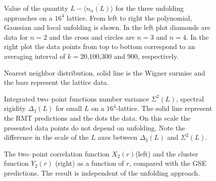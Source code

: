 \begin{figure}
\caption{Value of the quantity
  $L-\overline{\langle n_\alpha(L)\rangle}$ for the three unfolding
  approaches on a $16^4$ lattice. From left to right the polynomial,
  Gaussian and local unfolding is shown. In the left plot diamonds are
  data for $n=2$ and the cross and circles are $n=3$ and $n=4$.  In
  the right plot the data points from top to bottom correspond to an
  averaging interval of $k=20$,100,300 and 900,
  respectively.\label{mean}}
\end{figure}

\begin{figure}
\caption{Nearest neighbor distribution, solid line is the Wigner surmise
  and the bars represent the lattice data.\label{near}}
\end{figure}

\begin{figure}
\begin{minipage}{7.5cm}
  \centerline{}
\end{minipage}
\hfill
\begin{minipage}{7.5cm}
\centerline{}
\end{minipage}
\caption{Integrated two--point functions number variance $\Sigma^2(L)$,
  spectral rigidity $\Delta_3(L)$ for small $L$ on a $16^4$-lattice.
  The solid line represent the RMT predictions and the dots the data.
  On this scale the presented data points do not depend on unfolding.
  Note the difference in the scale of the $L$ axes between
  $\Delta_3(L)$ and $\Sigma^2(L)$.
  \label{agree1}}
\end{figure}

\begin{figure}
\begin{minipage}{7.5cm}
\centerline{}
\end{minipage}
\begin{minipage}{7.5cm}
\centerline{}
\end{minipage}
\caption{\label{twfig1}
  The two--point correlation function $X_2(r)$(left) and the cluster
  function $Y_2(r)$ (right) as a function of $r$, compared with the
  GSE predictions.  The result is independent of the unfolding
  approach.}
\end{figure}

